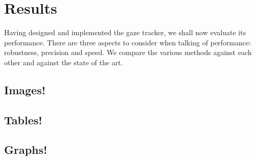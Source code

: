 \chapter{Results}

Having designed and implemented the gaze tracker, we shall now evaluate its performance.
There are three aspects to consider when talking of performance: robustness, precision and speed.
We compare the various methods against each other and against the state of the art.

\section{Images!}
\section{Tables!}
\section{Graphs!}
